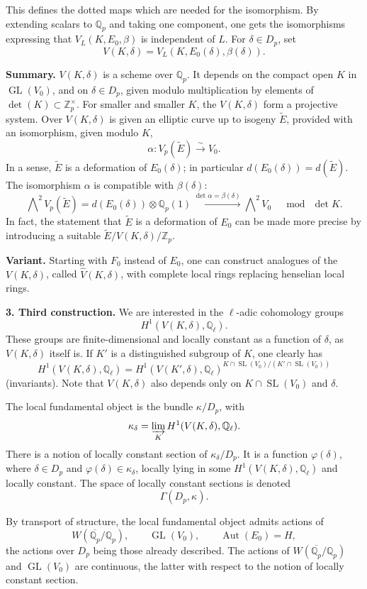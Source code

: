 \documentclass[11pt]{article}
\newcommand{\Qp}{\mathbb{Q}_{p}}
\newcommand{\Zp}{\mathbb{Z}_{p}}
\newcommand{\Ql}{\mathbb{Q}_{\ell}}
\newcommand{\Aut}{\operatorname{Aut}}
\newcommand{\GL}{\operatorname{GL}}
\newcommand{\SL}{\operatorname{SL}}
\newcommand{\Lim}{\varinjlim}
\newcommand{\wt}{\widetilde}
\newcommand{\wh}{\widehat}
\begin{document}
This defines the dotted maps which are needed for the isomorphism.
By extending scalars to \(\Qp\) and taking one component, one gets the isomorphisms expressing that \(V_L(K,E_0,\beta)\) is independent of \(L\). For \(\delta\in D_p\), set
\[
V(K,\delta)=V_L(K,E_0(\delta),\beta(\delta)).
\]

\textbf{Summary.} \(V(K,\delta)\) is a scheme over \(\Qp\). It depends on the compact open \(K\) in \(\GL(V_0)\), and on \(\delta\in D_p\), given modulo multiplication by elements of \(\det(K)\subset\Zp^\times\). For smaller and smaller \(K\), the \(V(K,\delta)\) form a projective system. Over \(V(K,\delta)\) is given an elliptic curve up to isogeny \(\wt E\), provided with an isomorphism, given modulo \(K\),
\[
\alpha:V_p(\wt E)\xrightarrow{\sim}V_0.
\]
In a sense, \(\wt E\) is a deformation of \(E_0(\delta)\); in particular \(d(E_0(\delta))=d(\wt E)\). The isomorphism \(\alpha\) is compatible with \(\beta(\delta)\):
\[
\bigwedge\nolimits^2V_p(\wt E)
=d(E_0(\delta))\otimes\Qp(1)
\xrightarrow{\det\alpha=\beta(\delta)}
\bigwedge\nolimits^2V_0
\quad\bmod\ \det K.
\]
In fact, the statement that \(\wt E\) is a deformation of \(E_0\) can be made more precise by introducing a suitable \(\wt E/V(K,\delta)/\Zp\).

\textbf{Variant.} Starting with \(F_0\) instead of \(E_0\), one can construct analogues of the \(V(K,\delta)\), called \(\wh V(K,\delta)\), with complete local rings replacing henselian local rings.

\textbf{3. Third construction.} We are interested in the \(\ell\)-adic cohomology groups
\[
H^1(V(K,\delta),\Ql).
\]
These groups are finite-dimensional and locally constant as a function of \(\delta\), as \(V(K,\delta)\) itself is. If \(K'\) is a distinguished subgroup of \(K\), one clearly has
\[
H^1(V(K,\delta),\Ql)=
H^1(V(K',\delta),\Ql)^{K\cap\SL(V_0)/(K'\cap\SL(V_0))}
\]
(invariants). Note that \(V(K,\delta)\) also depends only on \(K\cap\SL(V_0)\) and \(\delta\).

The local fundamental object is the bundle \(\kappa/D_p\), with
\[
\kappa_{\delta}=\Lim_K H^1(V(K,\delta),\Ql).
\]
There is a notion of locally constant section of \(\kappa_\delta/D_p\). It is a function \(\varphi(\delta)\), where \(\delta\in D_p\) and \(\varphi(\delta)\in\kappa_\delta\), locally lying in some \(H^1(V(K,\delta),\Ql)\) and locally constant. The space of locally constant sections is denoted
\[
\Gamma(D_p,\kappa).
\]

By transport of structure, the local fundamental object admits actions of
\[
W(\overline{\Qp}/\Qp),\qquad \GL(V_0),\qquad \Aut(E_0)=H,
\]
the actions over \(D_p\) being those already described. The actions of \(W(\overline{\Qp}/\Qp)\) and \(\GL(V_0)\) are continuous, the latter with respect to the notion of locally constant section.
\end{document}
